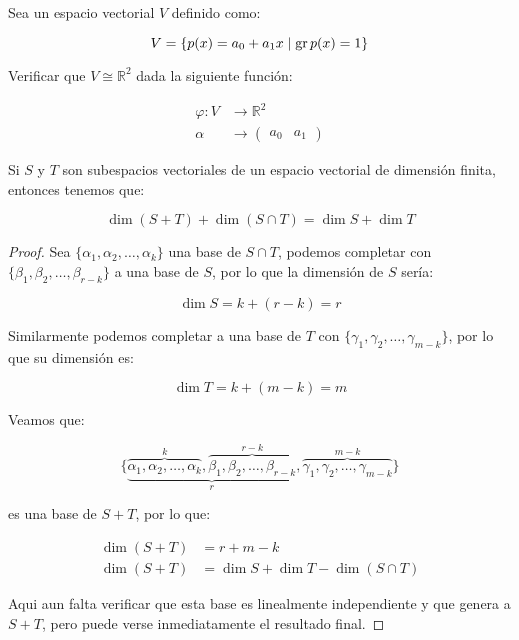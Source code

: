 		\begin{ejercicio}
			Sea un espacio vectorial $V$ definido como:

			\begin{equation*}
				V = \left\{ p(x) = a_0 + a_1 x \mid \operatorname{gr}{p(x)} = 1 \right\}
			\end{equation*}

			Verificar que $V \cong \mathbb{R}^2$ dada la siguiente función:

			\begin{align*}
				\varphi \colon V &\to \mathbb{R}^2 \\
				\alpha &\to \begin{pmatrix} a_0 & a_1 \end{pmatrix}
			\end{align*}
		\end{ejercicio}

		\begin{proposicion}
			Si $S$ y $T$ son subespacios vectoriales de un espacio vectorial de dimensión finita, entonces tenemos que:

			\begin{equation}
				\dim{(S + T)} + \dim{(S \cap T)} = \dim{S} + \dim{T}
			\end{equation}
		\end{proposicion}

		\begin{proof}
			Sea $\{\alpha_1, \alpha_2, \dots, \alpha_k\}$ una base de $S \cap T$, podemos completar con $\{\beta_1, \beta_2, \dots, \beta_{r-k}\}$ a una base de $S$, por lo que la dimensión de $S$ sería:

			\begin{equation*}
				\dim{S} = k + (r - k) = r
			\end{equation*}

			Similarmente podemos completar a una base de $T$ con $\{\gamma_1, \gamma_2, \dots, \gamma_{m-k}\}$, por lo que su dimensión es:

			\begin{equation*}
				\dim{T} = k + (m - k) = m
			\end{equation*}

			Veamos que:

			\begin{equation*}
				\{ \underbrace{\overbrace{\alpha_1, \alpha_2, \dots, \alpha_k}^k, \overbrace{\beta_1, \beta_2, \dots, \beta_{r-k}}^{r-k}}_{r}, \overbrace{\gamma_1, \gamma_2, \dots, \gamma_{m-k}}^{m-k} \}
			\end{equation*}

			es una base de $S + T$, por lo que:

			\begin{align*}
				\dim{(S + T)} &= r + m - k \\
				\dim{(S + T)} &= \dim{S} + \dim{T} - \dim{(S \cap T)}
			\end{align*}

			Aqui aun falta verificar que esta base es linealmente independiente y que genera a $S + T$, pero puede verse inmediatamente el resultado final.
		\end{proof}

